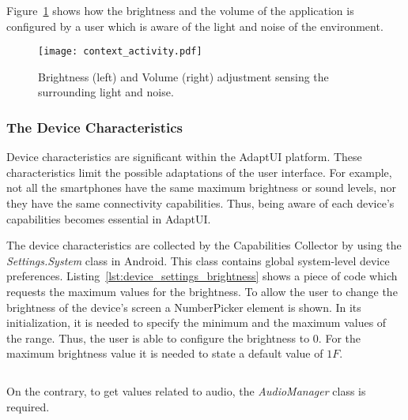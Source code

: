 \inputminted[linenos=true, fontsize=\footnotesize, frame=lines]{java}{4_system_architecture/shared_preferences_complex.java}

Figure~\ref{fig:context_activity} shows how the brightness and the volume of
the application is configured by a user which is aware of the light and noise
of the environment.

\begin{figure}
\centering
\texttt{[image: context\_activity.pdf]}
\caption{Brightness (left) and Volume (right) adjustment sensing the surrounding
light and noise.}
\label{fig:context_activity}
\end{figure}


\subsubsection{The Device Characteristics}
\label{sec:device_characteristics}

Device characteristics are significant within the AdaptUI platform. These
characteristics limit the possible adaptations of the user interface. For example,
not all the smartphones have the same maximum brightness or sound levels, nor
they have the same connectivity capabilities. Thus, being aware of each device's
capabilities becomes essential in AdaptUI.

The device characteristics are collected by the Capabilities Collector by using
the \textit{Settings.System} class in Android. This class contains global
system-level device preferences. Listing~\ref{lst:device_settings_brightness} 
shows a piece of code which requests the maximum values for the brightness. To 
allow the user to change the brightness of the device's screen a NumberPicker 
element is shown. In its initialization, it is needed to specify the minimum and 
the maximum values of the range. Thus, the user is able to configure the brightness 
to $0$. For the maximum brightness value it is needed to state a default value 
of $1F$.

\inputminted[linenos=true, fontsize=\footnotesize, frame=lines]{java}{4_system_architecture/device_settings_brightness.java}


On the contrary, to get values related to audio, the \textit{AudioManager} class
is required. 
% 


